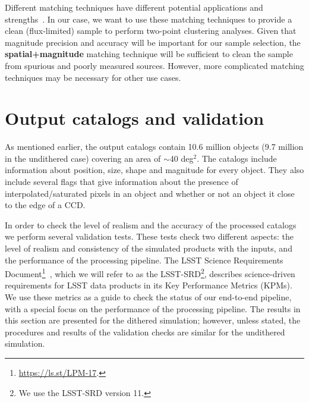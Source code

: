 \documentclass[a4paper,fleqn,usenatbib]{mnras}
\begin{document}
Different matching techniques have different potential applications and strengths~\citep{doi:10.1146/annurev-statistics-010814-020231}. In our case, we want to use these matching techniques to provide a clean (flux-limited) sample to perform two-point clustering analyses. Given that magnitude precision and accuracy will be important for our sample selection, the \textbf{spatial+magnitude} matching technique will be sufficient to clean the sample from spurious and poorly measured sources. However, more complicated matching techniques may be necessary for other use cases.
 
 
\section{Output catalogs and validation}
\label{sec:catalogs}
As mentioned earlier, the output catalogs contain 10.6 million objects (9.7 million in the undithered case) covering an area
of $\sim$40 deg$^{2}$. The catalogs include information about position, size, shape and magnitude for every object. They also include several flags that give information about the presence of interpolated/saturated pixels in an object and whether or not an object it close to the edge of a CCD.


In order to check the level of realism and the accuracy of the processed catalogs we perform several validation tests. These tests check two different aspects: the level of realism and consistency of the simulated products with the inputs, and the performance of the processing pipeline. The LSST Science Requirements Document\footnote{\url{https://ls.st/LPM-17}.}~\citep{LPM-17}, which we will refer to as the LSST-SRD\footnote{We use the LSST-SRD version 11.}, describes science-driven requirements for LSST data products in its Key Performance Metrics (KPMs). We use these metrics as a guide to check the status of our end-to-end pipeline, with a special focus on the performance of the processing pipeline. The results in this section are presented for the dithered simulation; however, unless stated, the procedures and results of the validation checks are similar for the undithered simulation. 
\end{document}
